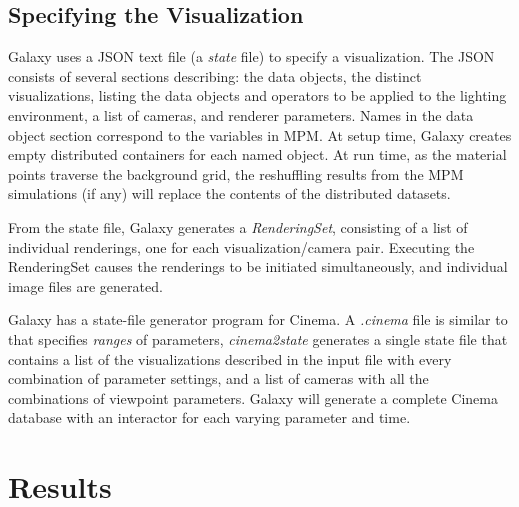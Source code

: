 \documentclass[journal]{IEEEtran}
\begin{document}
\subsection{Specifying the Visualization}

Galaxy uses a JSON text file (a \textit{state} file) to specify a visualization.  The JSON consists of several sections describing: the data objects, the distinct visualizations, listing the data objects and operators to be applied to the lighting environment, a list of cameras, and renderer parameters.  Names in the data object section correspond to the variables in MPM. At setup time, Galaxy creates empty distributed containers for each named object.  At run time, as the material points traverse the background grid, the reshuffling results from the MPM simulations (if any) will replace the contents of the distributed datasets.  

From the state file, Galaxy generates a \textit{RenderingSet}, consisting of a list of individual renderings, one for each visualization/camera pair.  Executing the RenderingSet causes the renderings to be initiated simultaneously, and individual image files are generated.

Galaxy has a state-file generator program for Cinema.  A \textit{.cinema} file is similar to that specifies \textit{ranges} of parameters, \textit{cinema2state} generates a single state file that contains a list of the visualizations described in the input file with every combination of parameter settings, and a list of cameras with all the combinations of viewpoint parameters.  Galaxy will generate a complete Cinema database with an interactor for each varying parameter and time.

\section{Results}
\end{document}
